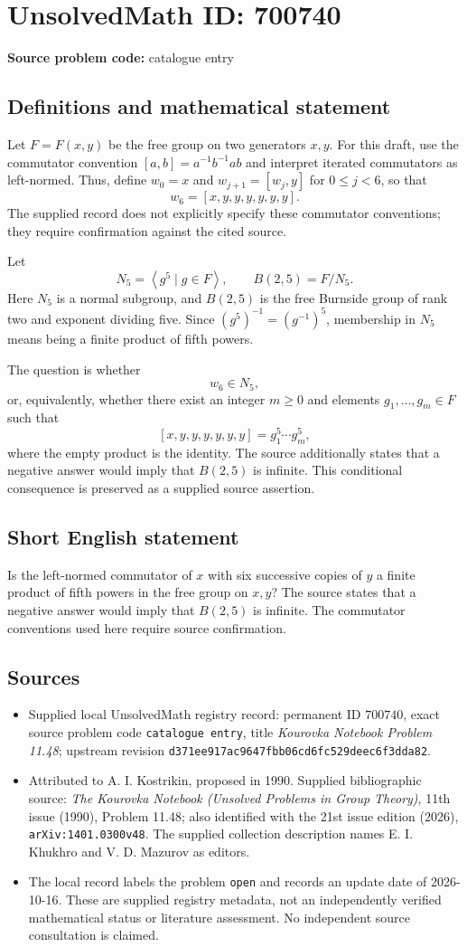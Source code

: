 \documentclass[11pt]{article}
\begin{document}
\section*{UnsolvedMath ID: 700740}
\textbf{Source problem code:} catalogue entry
\subsection{Definitions and mathematical statement}
Let \(F=F(x,y)\) be the free group on two generators \(x,y\). For this draft, use the commutator convention \([a,b]=a^{-1}b^{-1}ab\) and interpret iterated commutators as left-normed. Thus, define \(w_0=x\) and \(w_{j+1}=[w_j,y]\) for \(0\leq j<6\), so that
\[
w_6=[x,y,y,y,y,y,y].
\]
The supplied record does not explicitly specify these commutator conventions; they require confirmation against the cited source.

Let
\[
N_5=\left\langle g^5\mid g\in F\right\rangle,
\qquad B(2,5)=F/N_5.
\]
Here \(N_5\) is a normal subgroup, and \(B(2,5)\) is the free Burnside group of rank two and exponent dividing five. Since \((g^5)^{-1}=(g^{-1})^5\), membership in \(N_5\) means being a finite product of fifth powers.

The question is whether
\[
w_6\in N_5,
\]
or, equivalently, whether there exist an integer \(m\geq0\) and elements \(g_1,\ldots,g_m\in F\) such that
\[
[x,y,y,y,y,y,y]=g_1^5\cdots g_m^5,
\]
where the empty product is the identity. The source additionally states that a negative answer would imply that \(B(2,5)\) is infinite. This conditional consequence is preserved as a supplied source assertion.
\subsection{Short English statement}
Is the left-normed commutator of \(x\) with six successive copies of \(y\) a finite product of fifth powers in the free group on \(x,y\)? The source states that a negative answer would imply that \(B(2,5)\) is infinite. The commutator conventions used here require source confirmation.
\subsection{Sources}
\begin{itemize}
\item Supplied local UnsolvedMath registry record: permanent ID \(700740\), exact source problem code \texttt{catalogue entry}, title \emph{Kourovka Notebook Problem 11.48}; upstream revision \texttt{d371ee917ac9647fbb06cd6fc529deec6f3dda82}.
\item Attributed to A. I. Kostrikin, proposed in 1990. Supplied bibliographic source: \emph{The Kourovka Notebook (Unsolved Problems in Group Theory)}, 11th issue (1990), Problem 11.48; also identified with the 21st issue edition (2026), \texttt{arXiv:1401.0300v48}. The supplied collection description names E. I. Khukhro and V. D. Mazurov as editors.
\item The local record labels the problem \texttt{open} and records an update date of 2026-10-16. These are supplied registry metadata, not an independently verified mathematical status or literature assessment. No independent source consultation is claimed.
\end{itemize}
\end{document}
